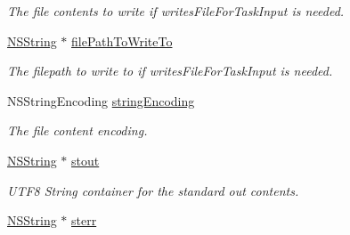 \begin{DoxyCompactItemize}
\begin{DoxyCompactList}\small\item\em The file contents to write if writesFileForTaskInput is needed. \item\end{DoxyCompactList}\item 
\hypertarget{interface_g_d_base_n_s_task_operation_a31470388b00262e45dd010d759ab9db2}{
\hyperlink{class_n_s_string}{NSString} $\ast$ \hyperlink{interface_g_d_base_n_s_task_operation_a31470388b00262e45dd010d759ab9db2}{filePathToWriteTo}}
\label{interface_g_d_base_n_s_task_operation_a31470388b00262e45dd010d759ab9db2}

\begin{DoxyCompactList}\small\item\em The filepath to write to if writesFileForTaskInput is needed. \item\end{DoxyCompactList}\item 
\hypertarget{interface_g_d_base_n_s_task_operation_a0adb5999833989523a2da778672feb96}{
NSStringEncoding \hyperlink{interface_g_d_base_n_s_task_operation_a0adb5999833989523a2da778672feb96}{stringEncoding}}
\label{interface_g_d_base_n_s_task_operation_a0adb5999833989523a2da778672feb96}

\begin{DoxyCompactList}\small\item\em The file content encoding. \item\end{DoxyCompactList}\item 
\hypertarget{interface_g_d_base_n_s_task_operation_a16d2ce9720bf88f5e6abb5a760e800d8}{
\hyperlink{class_n_s_string}{NSString} $\ast$ \hyperlink{interface_g_d_base_n_s_task_operation_a16d2ce9720bf88f5e6abb5a760e800d8}{stout}}
\label{interface_g_d_base_n_s_task_operation_a16d2ce9720bf88f5e6abb5a760e800d8}

\begin{DoxyCompactList}\small\item\em UTF8 String container for the standard out contents. \item\end{DoxyCompactList}\item 
\hypertarget{interface_g_d_base_n_s_task_operation_a65ec6548ae07a9ba2f79e1e152820ea3}{
\hyperlink{class_n_s_string}{NSString} $\ast$ \hyperlink{interface_g_d_base_n_s_task_operation_a65ec6548ae07a9ba2f79e1e152820ea3}{sterr}}
\label{interface_g_d_base_n_s_task_operation_a65ec6548ae07a9ba2f79e1e152820ea3}


\end{DoxyCompactItemize}
